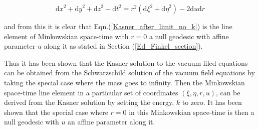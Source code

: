 \begin{equation*}
{\mathrm{d}x}^2 + {\mathrm{d}y}^2 + {\mathrm{d}z}^2 - {\mathrm{d}t}^2 = r^2 ({\mathrm{d}\xi}^2 + {\mathrm{d}\eta}^2) - 2 {\mathrm{d}u}{\mathrm{d}r}
\end{equation*}

\noindent and from this it is clear that Eqn.(\ref{Kasner_after_limit_no_k}) is the line element of Minkowskian space-time with $r = 0$ a null geodesic with affine parameter $u$ along it as stated in Section (\ref{Ed_Finkel_section}).

Thus it has been shown that the Kasner solution to the vacuum filed equations can be obtained from the Schwarzschild solution of the vacuum field equations by taking the special case where the mass goes to infinity. Then the Minkowskian space-time line element in a particular set of coordinates $(\xi, \eta, r, u)$, can be derived from the Kasner solution by setting the energy, $k$ to zero. It has been shown that the special case where $r=0$ in this Minkowskian space-time is then a null geodesic with $u$ an affine parameter along it.  
